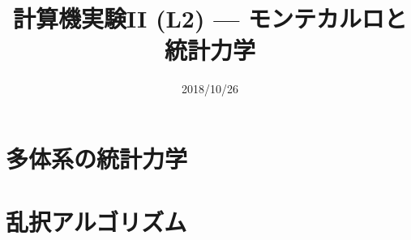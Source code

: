 \documentclass[dvipdfmx]{beamer}
\title{計算機実験II (L2) --- モンテカルロと統計力学}
\date{2018/10/26}
\begin{document}
\begin{frame}
  \titlepage
  \tableofcontents
\end{frame}

\section{多体系の統計力学}






\section{乱択アルゴリズム}








\end{document}
